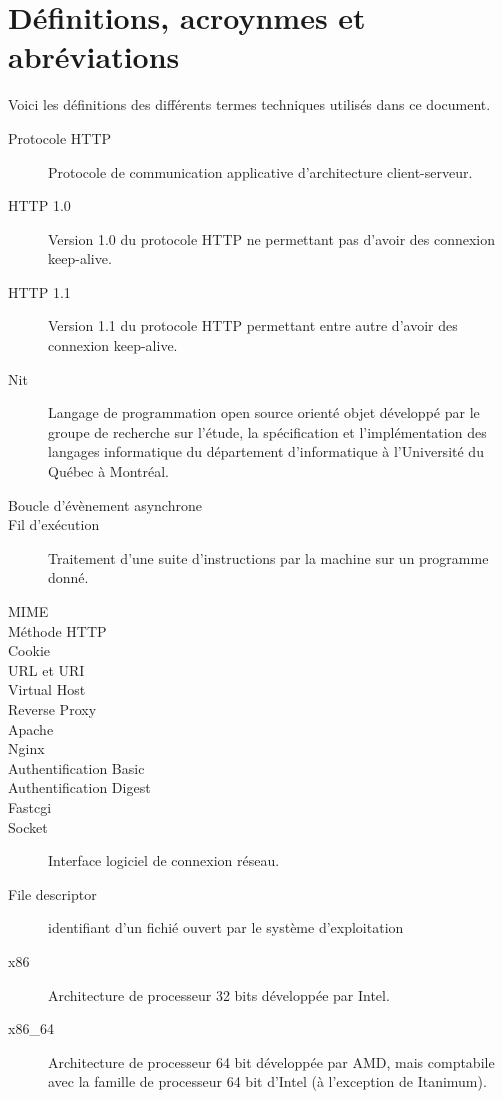 \documentclass{scrreprt}
\begin{document}
\section{Définitions, acroynmes et abréviations}
Voici les définitions des différents termes techniques utilisés dans ce
document.
\begin{description}
\item[Protocole HTTP] Protocole de communication applicative d'architecture
client-serveur\cite{http}.
\item[HTTP 1.0] Version 1.0 du protocole HTTP ne permettant pas d'avoir des
connexion keep-alive.
\item[HTTP 1.1] Version 1.1 du protocole HTTP permettant entre autre d'avoir des
connexion keep-alive\cite{http1.0}.
\item[Nit] Langage de programmation open source orienté objet développé par le
groupe de recherche sur l'étude, la spécification et l'implémentation des
langages informatique du département d'informatique à l'Université du Québec à
Montréal.
    \item[Boucle d'évènement asynchrone] 
    \item[Fil d'exécution] Traitement d'une suite d'instructions par la machine sur un programme donné.
    \item[MIME]
    \item[Méthode HTTP]
    \item[Cookie]
    \item[URL et URI]
    \item[Virtual Host]
    \item[Reverse Proxy]
    \item[Apache]
    \item[Nginx]
    \item[Authentification Basic]
    \item[Authentification Digest]
    \item[Fastcgi]
    \item[Socket] Interface logiciel de connexion réseau.
    \item[File descriptor] identifiant d'un fichié ouvert par le système d'exploitation
    \item[x86] Architecture de processeur 32 bits développée par Intel.
    \item[x86_64] Architecture de processeur 64 bit développée par AMD, mais comptabile avec la famille de processeur 64 bit d'Intel (à l'exception de Itanimum).
\end{description}
\end{document}
